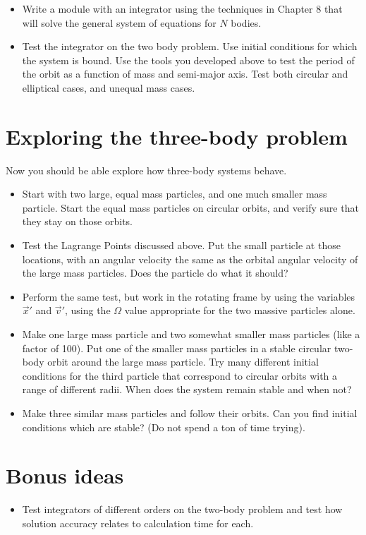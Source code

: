 \documentclass[11pt, preprint]{aastex}
\begin{document}
\begin{itemize}
\item Write a module with an integrator using the techniques in 
  Chapter 8 that will solve the general system of equations for $N$
  bodies.
\item Test the integrator on the two body problem. Use initial
  conditions for which the system is bound. Use the tools you
  developed above to test the period of the orbit as a function of
  mass and semi-major axis. Test both circular and elliptical cases,
  and unequal mass cases.
\end{itemize}

\section{Exploring the three-body problem}

Now you should be able explore how three-body systems behave. 

\begin{itemize}
\item Start with two large, equal mass particles, and one much smaller
  mass particle. Start the equal mass particles on circular orbits,
  and verify sure that they stay on those orbits. 
\item Test the Lagrange Points discussed above.  Put the small
  particle at those locations, with an angular velocity the same as
  the orbital angular velocity of the large mass particles. Does the
  particle do what it should?
\item Perform the same test, but work in the rotating frame by using
  the variables $\vec{x}'$ and $\vec{v}'$, using the $\Omega$ value
  appropriate for the two massive particles alone. 
\item Make one large mass particle and two somewhat smaller mass
  particles (like a factor of 100). Put one of the smaller mass
  particles in a stable circular two-body orbit around the large mass
  particle. Try many different initial conditions for the third
  particle that correspond to circular orbits with a range of
  different radii. When does the system remain stable and when not?
\item Make three similar mass particles and follow their orbits. Can
  you find initial conditions which are stable? (Do not spend a ton of
  time trying).
\end{itemize}

\section{Bonus ideas}

\begin{itemize}
\item Test integrators of different orders on the two-body problem and
  test how solution accuracy relates to calculation time for each.
\end{itemize}
\end{document}
